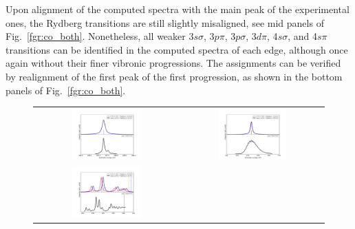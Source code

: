 \documentclass[journal=jctcce,manuscript=article]{achemso}
\begin{document}
Upon alignment of the computed spectra with the main peak of the experimental ones, the Rydberg transitions are still slightly misaligned, see mid panels of Fig.~\ref{fgr:co_both}.
Nonetheless, all weaker 3$s\sigma$, 3$p\pi$, 3$p\sigma$, 3$d\pi$, 4$s\sigma$, and 4$s\pi$ transitions can be identified in the computed spectra of each edge, although once again without their finer vibronic progressions. The assignments can be verified by realignment of the first peak of the first progression, as shown in the bottom panels of Fig.~\ref{fgr:co_both}. 


\begin{figure}\vspace{-0.5cm}
\begin{tabular}{cc}
\hspace{-1cm}\includegraphics[width=0.50\textwidth]{Spectra/CO_C_1.pdf} &
\includegraphics[width=0.50\textwidth]{Spectra/CO_O_1.pdf}\\\vspace{-0.5cm}
\hspace{-1cm}\includegraphics[width=0.50\textwidth]{Spectra/CO_C_2_newshift.pdf} &

\end{tabular}
\end{figure}
\end{document}
